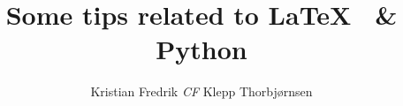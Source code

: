 \author{Kristian Fredrik \emph{CF} Klepp Thorbjørnsen}
\title{Some tips related to \LaTeX~ \& Python}